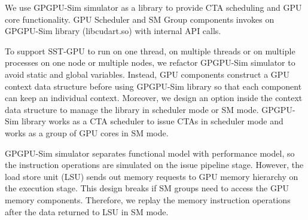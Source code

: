We use GPGPU-Sim simulator as a library to provide CTA scheduling and GPU core
functionality. GPU Scheduler and SM Group components invokes on GPGPU-Sim library
(libcudart.so) with internal API calls.

To support SST-GPU to run on one thread, on multiple threads or on multiple
processes on one node or multiple nodes, we refactor GPGPU-Sim simulator to avoid
static and global variables. Instead, GPU components construct a GPU context data
structure before using GPGPU-Sim library so that each component can keep an
individual context. Moreover, we design an option inside the context data structure
to manage the library in scheduler mode or SM mode. GPGPU-Sim library works as
a CTA scheduler to issue CTAs in scheduler mode and works as a group of GPU cores in SM mode.

GPGPU-Sim simulator separates functional model with performance model, so the
instruction operations are simulated on the issue pipeline stage. However, the load store
unit (LSU) sends out memory requests to GPU memory hierarchy on the execution stage.
This design breaks if SM groups need to access the GPU memory components.
Therefore, we replay the memory instruction operations after the data returned
to LSU in SM mode.
